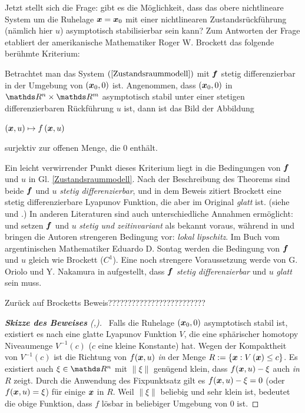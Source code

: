Jetzt stellt sich die Frage: gibt es die Möglichkeit, dass das obere nichtlineare System um die Ruhelage $\boldsymbol x=\boldsymbol x_{0}$ mit einer nichtlinearen Zustandsrückführung (nämlich hier $u$) asymptotisch stabilisierbar sein kann? Zum Antworten der Frage etabliert der amerikanische Mathematiker Roger W. Brockett das folgende berühmte Kriterium\cite{brockett1983asymptotic}:
\begin{theorem}
Betrachtet man das System $(\ref{Zustandsraummodell})$ mit $\boldsymbol f$ stetig differenzierbar in der Umgebung von $(\boldsymbol x_{0},0)$ ist. Angenommen, dass $(\boldsymbol x_{0},0)$ in $\Reals^{n}\times\Reals^{m}$ asymptotisch stabil unter einer stetigen differenzierbaren Rückführung $u$ ist, dann ist das Bild der Abbildung
\begin{center}$\left ( \boldsymbol x,u \right ) \mapsto f\left ( \boldsymbol x,u \right )$\end{center}
surjektiv zur offenen Menge, die 0 enthält.
\end{theorem}
Ein leicht verwirrender Punkt dieses Kriterium liegt in die Bedingungen von $\boldsymbol f$ und $u$ in Gl. \ref{Zustandsraummodell}. Nach der Beschreibung des Theorems sind beide $\boldsymbol f$ und $u$ \emph{stetig differenzierbar}, und in dem Beweis zitiert Brockett eine stetig differenzierbare Lyapunov Funktion, die aber im Original \emph{glatt} ist. (siehe \cite[S.186]{brockett1983asymptotic} und \cite[S.324]{wilson1967structure}.) In anderen Literaturen sind auch unterschiedliche Annahmen ermöglicht: \cite{coron2007control} und \cite{orsi2003necessary} setzen $\boldsymbol f$ und $u$ \emph{stetig und zeitinvariant} als bekannt voraus, während in \cite{stern2002brockett} und \cite{colonius2012nichtlineare} bringen die Autoren strengeren Bedingung vor: \emph{lokal lipschitz}. Im Buch vom argentinischen Mathematiker Eduardo D. Sontag \cite{sontag2013mathematical} werden die Bedingung von $\boldsymbol f$ und $u$ gleich wie Brockett ($C^{1}$). Eine noch strengere Voraussetzung werde von G. Oriolo und Y. Nakamura in \cite{oriolo1991control} aufgestellt, dass $\boldsymbol f$ \emph{stetig differenzierbar} und $u$ \emph{glatt} sein muss.

Zurück auf Brocketts Beweis?????????????????????????

\begin{proof}[\textbf{Skizze des Beweises} (\cite{brockett1983asymptotic},\cite{liberzon2012switching})]~Falls die Ruhelage $(\boldsymbol x_{0},0)$ asymptotisch stabil ist, existiert es nach \cite{wilson1967structure} eine glatte Lyapunov Funktion $V$, die eine sphärischer homotopy Niveaumenge $V^{-1}(c)$ ($c$ eine kleine Konstante) hat. Wegen der Kompaktheit von $V^{-1}(c)$ ist die Richtung von $f(\boldsymbol x,u)$ \emph{in} der Menge $R:= \left \{ \boldsymbol x:V\left (\boldsymbol x  \right )\leq c \right \}$. Es existiert auch $\xi \in \Reals^{n}$ mit $\left \| \xi \right \|$ genügend klein, dass $f(\boldsymbol x,u)-\xi$ auch \emph{in} $R$ zeigt. Durch die Anwendung des Fixpunktsatz gilt es $f(\boldsymbol x,u)-\xi=0$ (oder $f(\boldsymbol x,u)=\xi$) für einige $\boldsymbol x$ in $R$. Weil $\left \| \xi \right \|$ beliebig und sehr klein ist, bedeutet die obige Funktion, dass $f$ lösbar in beliebiger Umgebung von 0 ist.
\end{proof} %


